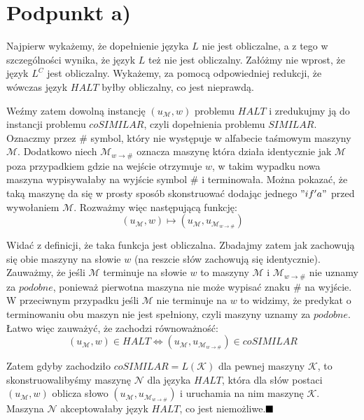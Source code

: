 \documentclass{article}
\author{Hubert Michalski}
\begin{document}
\Large
\maketitle

\section{Podpunkt a)}

Najpierw wykażemy, że dopełnienie języka $L$ nie jest obliczalne, a z tego w szczególności wynika, że język $L$ też nie jest obliczalny. Załóżmy nie wprost, że język $L^C$ jest obliczalny. Wykażemy, za pomocą odpowiedniej redukcji, że wówczas język $HALT$ byłby obliczalny, co jest nieprawdą.

Weźmy zatem dowolną instancję $(u_\mathcal{M}, w)$ problemu $HALT$ i zredukujmy ją do instancji problemu $coSIMILAR$, czyli dopełnienia problemu $SIMILAR$. Oznaczmy przez $\#$ symbol, który nie występuje w alfabecie taśmowym maszyny $\mathcal{M}$. Dodatkowo niech $\mathcal{M}_{w \rightarrow \#}$ oznacza maszynę która działa identycznie jak $\mathcal{M}$ poza przypadkiem gdzie na wejście otrzymuje $w$, w takim wypadku nowa maszyna wypisywałaby na wyjście symbol $\#$ i terminowała. Można pokazać, że taką maszynę da się w prosty sposób skonstruować dodając jednego $"if'a"$ przed wywołaniem $\mathcal{M}$. Rozważmy więc następującą funkcję:
$$
(u_{\mathcal{M}}, w) \mapsto (u_{\mathcal{M}}, u_{\mathcal{M}_{w \rightarrow\#}})
$$

Widać z definicji, że taka funkcja jest obliczalna. Zbadajmy zatem jak zachowują się obie maszyny na słowie $w$ (na reszcie słów zachowują się identycznie). Zauważmy, że jeśli $\mathcal{M}$ terminuje na słowie $w$ to maszyny $\mathcal{M}$ i $\mathcal{M}_{w \rightarrow\#}$ nie uznamy za $podobne$, ponieważ pierwotna maszyna nie może wypisać znaku $\#$ na wyjście. W przeciwnym przypadku jeśli $\mathcal{M}$ nie terminuje na $w$ to widzimy, że predykat o terminowaniu obu maszyn nie jest spełniony, czyli maszyny uznamy za $podobne$. Łatwo więc zauważyć, że zachodzi równoważność:
$$
(u_{\mathcal{M}}, w) \in HALT \iff (u_{\mathcal{M}}, u_{\mathcal{M}_{w \rightarrow\#}}) \in coSIMILAR
$$

Zatem gdyby zachodziło $coSIMILAR=L(\mathcal{K})$ dla pewnej maszyny $\mathcal{K}$, to skonstruowalibyśmy maszynę $\mathcal{N}$ dla języka $HALT$, która dla słów postaci $(u_{\mathcal{M}}, w)$ oblicza słowo $(u_{\mathcal{M}}, u_{\mathcal{M}_{w \rightarrow\#}})$ i uruchamia na nim maszynę $\mathcal{K}$. Maszyna $\mathcal{N}$ akceptowałaby język $HALT$, co jest niemożliwe.$ \hfill \blacksquare$
\newpage
\end{document}
